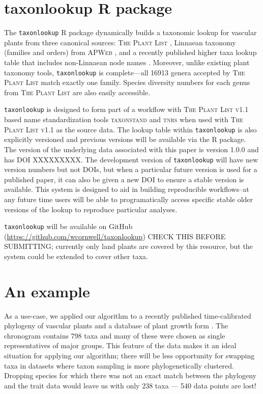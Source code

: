 \documentclass[a4paper,11pt]{article}
\newcommand{\taxonlookup}{\tt taxonlookup}
\begin{document}
\section{taxonlookup R package}

The {\taxonlookup} R package dynamically builds a taxonomic lookup for vascular plants from three canonical sources: \textsc{The Plant List} \citep{ThePlantList}, Linnaean taxonomy (families and orders) from \textsc{APWeb} \citep{apweb}, and a recently published higher taxa lookup table that includes non-Linnaean node names \citep[][compiled by D.C. Tank, J.M. Eastman, J.M. Beaulieu, W.K. Cornwell, P.F. Stevens, and A.E. Zanne]{ZanneDryad}.  Moreover, unlike existing plant taxonomy tools, {\taxonlookup} is complete---all 16913 genera accepted by  \textsc{The Plant List} match exactly one family.  Species diversity numbers for each genus from \textsc{The Plant List} are also easily accessible.  

{\taxonlookup} is designed to form part of a workflow with \textsc{The Plant List v1.1} based name standardization tools \textsc{taxonstand} \citep{Cayuela2014} and \textsc{tnrs} \citep{boyle2013taxonomic} when used with \textsc{The Plant List  v1.1} as the source data.   The lookup table within {\taxonlookup} is also explicitly versioned and previous versions will be available via the R package.   The version of the underlying data associated with this paper is version 1.0.0 and has DOI XXXXXXXXX.   The development version of {\taxonlookup} will have new version numbers but not DOIs, but when a particular future version is used for a published paper, it can also be given a new DOI to ensure a stable version is available.  This system is designed to aid in building reproducible workflows--at any future time users will be able to programatically access specific stable older versions of the lookup to reproduce particular analyses. 

 {\taxonlookup} will be available on GitHub (\url{https://github.com/wcornwell/taxonlookup}) CHECK THIS BEFORE SUBMITTING; currently only land plants are covered by this resource, but the system could be extended to cover other taxa. 

\section{An example}

As a use-case, we applied our algorithm to a recently published time-calibrated phylogeny of vascular plants \citep{Magallon2015} and a database of plant growth form \citep{Zanne}. The \citet{Magallon2015} chronogram contains 798 taxa and many of these were chosen as single representatives of major groups. This feature of the data makes it an ideal situation for applying our algorithm; there will be less opportunity for swapping taxa in datasets where taxon sampling is more phylogenetically clustered. Dropping species for which there was not an exact match between the phylogeny and the trait data would leave us with only 238 taxa --- 540 data points are lost!
\end{document}
